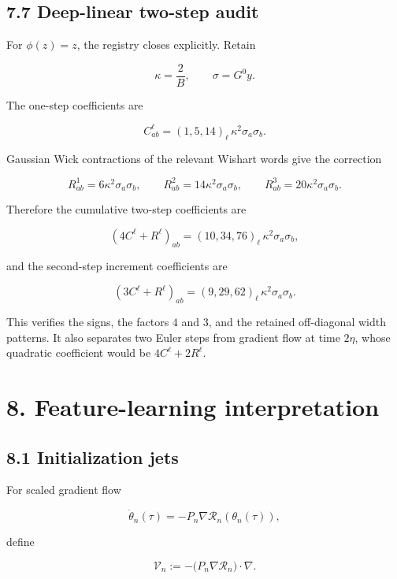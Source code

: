 \subsection*{7.7 Deep-linear two-step audit}


For \(\phi(z)=z\), the registry closes explicitly. Retain

\[
\kappa=\frac2B,
\qquad
\sigma=G^0y.
\]


The one-step coefficients are

\[
C^\ell_{ab}
=
(1,5,14)_\ell\,
\kappa^2\sigma_a\sigma_b.
\]


Gaussian Wick contractions of the relevant Wishart words give the correction

\[
\boxed{
R^1_{ab}=6\kappa^2\sigma_a\sigma_b,\qquad
R^2_{ab}=14\kappa^2\sigma_a\sigma_b,\qquad
R^3_{ab}=20\kappa^2\sigma_a\sigma_b.
}
\]


Therefore the cumulative two-step coefficients are

\[
\boxed{
(4C^\ell+R^\ell)_{ab}
=
(10,34,76)_\ell\,
\kappa^2\sigma_a\sigma_b,
}
\]


and the second-step increment coefficients are

\[
\boxed{
(3C^\ell+R^\ell)_{ab}
=
(9,29,62)_\ell\,
\kappa^2\sigma_a\sigma_b.
}
\]


This verifies the signs, the factors \(4\) and \(3\), and the retained
off-diagonal width patterns. It also separates two Euler steps from gradient
flow at time \(2\eta\), whose quadratic coefficient would be
\(4C^\ell+2R^\ell\).

\section*{8. Feature-learning interpretation}


\subsection*{8.1 Initialization jets}


For scaled gradient flow

\[
\dot\theta_n(\tau)
=
-P_n\nabla\mathcal R_n(\theta_n(\tau)),
\]


define

\[
\mathcal V_n
:=
-\bigl(P_n\nabla\mathcal R_n\bigr)\cdot\nabla.
\]


